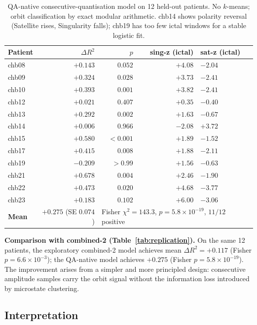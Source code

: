 \documentclass[11pt]{article}
\begin{document}
\begin{table}[h]
\centering
\small
\begin{tabular}{lrrrl}
\toprule
\textbf{Patient} & $\Delta R^2$ & $p$ & \textbf{sing-z (ictal)} & \textbf{sat-z (ictal)} \\
\midrule
chb08 & $+0.143$ & $0.052$ & $+4.08$ & $-2.04$ \\
chb09 & $+0.324$ & $0.028$ & $+3.73$ & $-2.41$ \\
chb10 & $+0.393$ & $0.001$ & $+3.82$ & $-2.41$ \\
chb12 & $+0.021$ & $0.407$ & $+0.35$ & $-0.40$ \\
chb13 & $+0.292$ & $0.002$ & $+1.63$ & $-0.67$ \\
chb14 & $+0.006$ & $0.966$ & $-2.08$ & $+3.72$ \\
chb15 & $+0.580$ & $<0.001$ & $+1.89$ & $-1.52$ \\
chb17 & $+0.415$ & $0.008$ & $+1.88$ & $-2.11$ \\
chb19 & $-0.209$ & $>0.99$ & $+1.56$ & $-0.63$ \\
chb21 & $+0.678$ & $0.004$ & $+2.46$ & $-1.90$ \\
chb22 & $+0.473$ & $0.020$ & $+4.68$ & $-3.77$ \\
chb23 & $+0.183$ & $0.102$ & $+6.00$ & $-3.06$ \\
\midrule
\textbf{Mean} & $+0.275$ (SE $0.074$) &
  \multicolumn{3}{l}{Fisher $\chi^2 = 143.3$,\; $p = 5.8 \times 10^{-19}$,\; $11/12$ positive} \\
\bottomrule
\end{tabular}
\caption{QA-native consecutive-quantisation model on 12 held-out patients.
No $k$-means; orbit classification by exact modular arithmetic.
chb14 shows polarity reversal (Satellite rises, Singularity falls); chb19
has too few ictal windows for a stable logistic fit.}
\label{tab:qa_native}
\end{table}

\noindent\textbf{Comparison with combined-2 (Table~\ref{tab:replication}).}
On the same 12 patients, the exploratory combined-2 model achieves
mean $\Delta R^2 = +0.117$ (Fisher $p = 6.6 \times 10^{-3}$);
the QA-native model achieves $+0.275$ (Fisher $p = 5.8 \times 10^{-19}$).
The improvement arises from a simpler and more principled design:
consecutive amplitude samples carry the orbit signal without the
information loss introduced by microstate clustering.

\subsection*{Interpretation}
\end{document}
